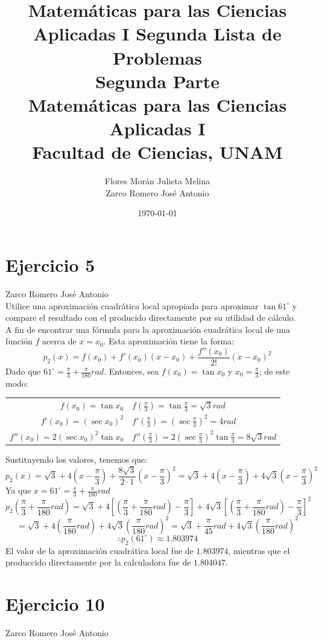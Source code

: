 \documentclass[12pt]{article}
\title{Matemáticas para las Ciencias Aplicadas I}
\title{
	Segunda Lista de Problemas \\
	\textbf{Segunda Parte} \\
	\vspace{1ex}
	\large Matemáticas para las Ciencias Aplicadas I \\
	Facultad de Ciencias, UNAM}
\date{\today}
\author{Flores Morán Julieta Melina \\ Zarco Romero José Antonio}
\begin{document}
\maketitle


\section{Ejercicio 5} Zarco Romero José Antonio \\

Utilice una aproximación cuadrática local apropiada para aproximar $\tan 61^{\circ}$ y compare el resultado con el producido directamente por su utilidad de cálculo. \\

A fin de encontrar una fórmula para la aproximación cuadrática local de una función $f$ acerca de $x=x_0$. Esta aproximación tiene la forma:
\[p_2(x)=f(x_0)+f'(x_0)(x-x_0)+\frac{f''(x_0)}{2!}(x-x_0)^2\]
Dado que $61^{\circ} = \frac{\pi}{3} + \frac{\pi}{180} rad$. Entonces, sea $f(x_0)=\tan x_0$ y $x_0=\frac{\pi}{3}$; de este modo:
\begin{center}
\begin{tabular}{r l}
$f(x_0)=\tan x_0$ & $f(\frac{\pi}{3})=\tan \frac{\pi}{3}=\sqrt 3 rad$ \\
$f'(x_0)=(\sec x_0)^2$ & $f'(\frac{\pi}{3})=(\sec \frac{\pi}{3})^2=4 rad$ \\
$f''(x_0)=2 (\sec x_0)^2 \tan x_0$ & $f''(\frac{\pi}{3})=2 (\sec \frac{\pi}{3})^2 \tan \frac{\pi}{3}=8\sqrt 3 rad$ \\
\end{tabular}
\end{center}
Sustituyendo los valores, tenemos que:
\[
p_2(x)=\sqrt 3 + 4(x-\frac{\pi}{3}) + \frac{8 \sqrt 3}{2 \cdot 1}(x-\frac{\pi}{3})^2
=\sqrt 3 + 4(x-\frac{\pi}{3}) + 4 \sqrt 3(x-\frac{\pi}{3})^2
\]
Ya que $x=61^{\circ}=\frac{\pi}{3} + \frac{\pi}{180}rad$
\[
p_2(\frac{\pi}{3} + \frac{\pi}{180}rad)
=\sqrt 3 + 4[(\frac{\pi}{3} + \frac{\pi}{180}rad)-\frac{\pi}{3}] + 4 \sqrt 3[(\frac{\pi}{3} + \frac{\pi}{180}rad)-\frac{\pi}{3}]^2
\]
\[
=\sqrt 3 + 4(\frac{\pi}{180}rad) + 4 \sqrt 3(\frac{\pi}{180}rad)^2
= \sqrt 3 + \frac{\pi}{45}rad + 4 \sqrt 3(\frac{\pi}{180}rad)^2
\]
\[\therefore p_2(61^{\circ}) \approx 1.803974\]
El valor de la aproximación cuadrática local fue de $1.803974$, mientras que el produccido directamente por la calculadora fue de $1.804047$.

\section{Ejercicio 10} Zarco Romero José Antonio \\
\end{document}
